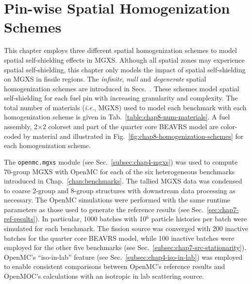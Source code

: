 \section{Pin-wise Spatial Homogenization Schemes}
\label{sec:chap8-pinwise-space-homogenize}

This chapter employs three different spatial homogenization schemes to model spatial self-shielding effects in \ac{MGXS}. Although all spatial zones may experience spatial self-shielding, this chapter only models the impact of spatial self-shielding on \ac{MGXS} in fissile regions. The \textit{infinite}, \textit{null} and \textit{degenerate} spatial homogenization schemes are introduced in Secs.~. These schemes model spatial self-shielding for each fuel pin with increasing granularity and complexity. The total number of materials (\textit{i.e.}, \ac{MGXS}) used to model each benchmark with each homogenization scheme is given in Tab.~\ref{table:chap8-num-materials}. A fuel assembly, 2$\times$2 colorset and part of the quarter core \ac{BEAVRS} model are color-coded by material and illustrated in Fig.~\ref{fig:chap8-homogenization-schemes} for each homogenization scheme.

The \texttt{openmc.mgxs} module (see Sec.~\ref{subsec:chap4-mgxs}) was used to compute 70-group \ac{MGXS} with OpenMC for each of the six heterogeneous benchmarks introduced in Chap.~\ref{chap:benchmarks}. The tallied \ac{MGXS} data was condensed to coarse 2-group and 8-group structures with downstream data processing as necessary. The OpenMC simulations were performed with the same runtime parameters as those used to generate the reference results (see Sec.~\ref{sec:chap7-ref-results}). In particular, 1000 batches with 10$^{6}$ particle histories per batch were simulated for each benchmark. The fission source was converged with 200 inactive batches for the quarter core \ac{BEAVRS} model, while 100 inactive batches were employed for the other five benchmarks (see Sec.~\ref{subsec:chap7-src-stationarity}). OpenMC's ``iso-in-lab'' feature (see Sec.~\ref{subsec:chap4-iso-in-lab}) was employed to enable consistent comparisons between OpenMC's reference results and OpenMOC's calculations with an isotropic in lab scattering source.

